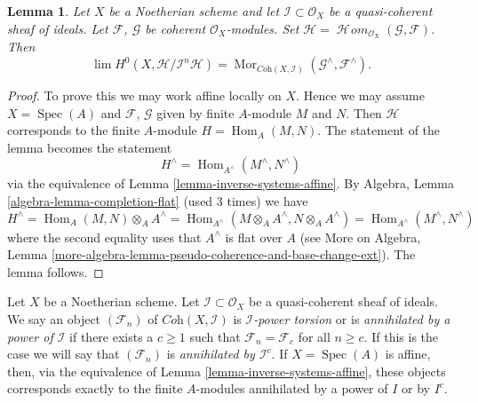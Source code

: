 \documentclass{stacks-project}
\theoremstyle{plain}
\newtheorem{lemma}[subsection]{Lemma}
\theoremstyle{definition}
\theoremstyle{remark}
\numberwithin{equation}{subsection}
\def\lim{\mathop{\mathrm{lim}}\nolimits}
\def\Spec{\mathop{\mathrm{Spec}}}
\def\Hom{\mathop{\mathrm{Hom}}\nolimits}
\def\SheafHom{\mathop{\mathcal{H}\!\mathit{om}}\nolimits}
\def\Mor{\mathop{\mathrm{Mor}}\nolimits}
\begin{document}
\begin{lemma}
\label{lemma-completion-internal-hom}
Let $X$ be a Noetherian scheme and let $\mathcal{I} \subset \mathcal{O}_X$
be a quasi-coherent sheaf of ideals. Let $\mathcal{F}$, $\mathcal{G}$ be
coherent $\mathcal{O}_X$-modules. Set
$\mathcal{H} = \SheafHom_{\mathcal{O}_X}(\mathcal{G}, \mathcal{F})$.
Then
$$
\lim H^0(X, \mathcal{H}/\mathcal{I}^n\mathcal{H}) =
\Mor_{\textit{Coh}(X, \mathcal{I})}
(\mathcal{G}^\wedge, \mathcal{F}^\wedge).
$$
\end{lemma}

\begin{proof}
To prove this we may work affine locally on $X$.
Hence we may assume $X = \Spec(A)$ and $\mathcal{F}$, $\mathcal{G}$
given by finite $A$-module $M$ and $N$. Then $\mathcal{H}$
corresponds to the finite $A$-module $H = \Hom_A(M, N)$.
The statement of the lemma becomes the statement
$$
H^\wedge = \Hom_{A^\wedge}(M^\wedge, N^\wedge)
$$
via the equivalence of Lemma \ref{lemma-inverse-systems-affine}.
By Algebra, Lemma \ref{algebra-lemma-completion-flat}
(used 3 times) we have
$$
H^\wedge = \Hom_A(M, N) \otimes_A A^\wedge =
\Hom_{A^\wedge}(M \otimes_A A^\wedge, N \otimes_A A^\wedge) =
\Hom_{A^\wedge}(M^\wedge, N^\wedge)
$$
where the second equality uses that $A^\wedge$ is flat over $A$
(see More on Algebra, Lemma
\ref{more-algebra-lemma-pseudo-coherence-and-base-change-ext}).
The lemma follows.
\end{proof}

\noindent
Let $X$ be a Noetherian scheme. Let $\mathcal{I} \subset \mathcal{O}_X$
be a quasi-coherent sheaf of ideals. We say an object $(\mathcal{F}_n)$ of
$\textit{Coh}(X, \mathcal{I})$ is {\it $\mathcal{I}$-power torsion}
or is {\it annihilated by a power of $\mathcal{I}$} if there exists
a $c \geq 1$ such that $\mathcal{F}_n = \mathcal{F}_c$ for all $n \geq c$.
If this is the case we will say that $(\mathcal{F}_n)$ is {\it annihilated by
$\mathcal{I}^c$}. If $X = \Spec(A)$ is affine, then, via the equivalence of
Lemma \ref{lemma-inverse-systems-affine},
these objects corresponds exactly to the finite $A$-modules
annihilated by a power of $I$ or by $I^c$.
\end{document}
